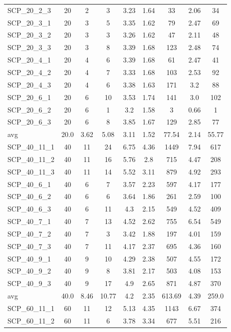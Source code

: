 \begin{table}[!ht]
{\begin{tabular}{lcccccccc}
SCP\_20\_2\_3 & 20 & 2 & 3 & 3.23 & 1.64 & 33 & 2.06 & 34 \\
SCP\_20\_3\_1 & 20 & 3 & 5 & 3.35 & 1.62 & 79 & 2.47 & 69 \\
SCP\_20\_3\_2 & 20 & 3 & 3 & 3.26 & 1.62 & 47 & 2.11 & 48 \\
SCP\_20\_3\_3 & 20 & 3 & 8 & 3.39 & 1.68 & 123 & 2.48 & 74 \\
SCP\_20\_4\_1 & 20 & 4 & 6 & 3.39 & 1.68 & 61 & 2.47 & 41 \\
SCP\_20\_4\_2 & 20 & 4 & 7 & 3.33 & 1.68 & 103 & 2.53 & 92 \\
SCP\_20\_4\_3 & 20 & 4 & 6 & 3.38 & 1.63 & 171 & 3.2 & 88 \\
SCP\_20\_6\_1 & 20 & 6 & 10 & 3.53 & 1.74 & 141 & 3.0 & 102 \\
SCP\_20\_6\_2 & 20 & 6 & 1 & 3.2 & 1.58 & 3 & 0.66 & 1 \\
SCP\_20\_6\_3 & 20 & 6 & 8 & 3.85 & 1.67 & 129 & 2.85 & 77 \\
\hline avg & 20.0 & 3.62 & 5.08& 3.11 & 1.52& 77.54 & 2.14& 55.77\\ \hline
SCP\_40\_11\_1 & 40 & 11 & 24 & 6.75 & 4.36 & 1449 & 7.94 & 617 \\
SCP\_40\_11\_2 & 40 & 11 & 16 & 5.76 & 2.8 & 715 & 4.47 & 208 \\
SCP\_40\_11\_3 & 40 & 11 & 14 & 5.52 & 3.11 & 879 & 4.92 & 293 \\
SCP\_40\_6\_1 & 40 & 6 & 7 & 3.57 & 2.23 & 597 & 4.17 & 177 \\
SCP\_40\_6\_2 & 40 & 6 & 6 & 3.64 & 1.86 & 261 & 2.59 & 100 \\
SCP\_40\_6\_3 & 40 & 6 & 11 & 4.3 & 2.15 & 549 & 4.52 & 409 \\
SCP\_40\_7\_1 & 40 & 7 & 13 & 4.52 & 2.62 & 755 & 6.54 & 549 \\
SCP\_40\_7\_2 & 40 & 7 & 3 & 3.42 & 1.88 & 197 & 4.01 & 159 \\
SCP\_40\_7\_3 & 40 & 7 & 11 & 4.17 & 2.37 & 695 & 4.36 & 160 \\
SCP\_40\_9\_1 & 40 & 9 & 10 & 4.29 & 2.38 & 507 & 4.55 & 172 \\
SCP\_40\_9\_2 & 40 & 9 & 8 & 3.81 & 2.17 & 503 & 4.08 & 153 \\
SCP\_40\_9\_3 & 40 & 9 & 17 & 4.9 & 2.65 & 871 & 4.87 & 370 \\
\hline avg & 40.0 & 8.46 & 10.77& 4.2 & 2.35& 613.69 & 4.39& 259.0\\ \hline
SCP\_60\_11\_1 & 60 & 11 & 12 & 5.13 & 4.35 & 1143 & 6.67 & 374 \\
SCP\_60\_11\_2 & 60 & 11 & 6 & 3.78 & 3.34 & 677 & 5.51 & 216 \\

\end{tabular}}
\end{table}
